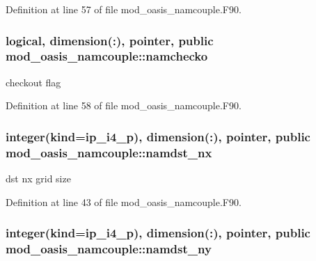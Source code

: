 Definition at line 57 of file mod\+\_\+oasis\+\_\+namcouple.\+F90.

\hypertarget{classmod__oasis__namcouple_a58c011820e55c9af9f306fbb1d45eb23}{
\subsubsection[{namchecko}]{\setlength{\rightskip}{0pt plus 5cm}logical, dimension(\+:), pointer, public mod\+\_\+oasis\+\_\+namcouple\+::namchecko}}\label{classmod__oasis__namcouple_a58c011820e55c9af9f306fbb1d45eb23}


checkout flag 



Definition at line 58 of file mod\+\_\+oasis\+\_\+namcouple.\+F90.

\hypertarget{classmod__oasis__namcouple_a6add94418eefdaefd78cd971888a5826}{
\subsubsection[{namdst\+\_\+nx}]{\setlength{\rightskip}{0pt plus 5cm}integer(kind=ip\+\_\+i4\+\_\+p), dimension(\+:), pointer, public mod\+\_\+oasis\+\_\+namcouple\+::namdst\+\_\+nx}}\label{classmod__oasis__namcouple_a6add94418eefdaefd78cd971888a5826}


dst nx grid size 



Definition at line 43 of file mod\+\_\+oasis\+\_\+namcouple.\+F90.

\hypertarget{classmod__oasis__namcouple_a9035fc89396bad9574c88642d3aac5f0}{
\subsubsection[{namdst\+\_\+ny}]{\setlength{\rightskip}{0pt plus 5cm}integer(kind=ip\+\_\+i4\+\_\+p), dimension(\+:), pointer, public mod\+\_\+oasis\+\_\+namcouple\+::namdst\+\_\+ny}}\label{classmod__oasis__namcouple_a9035fc89396bad9574c88642d3aac5f0}


